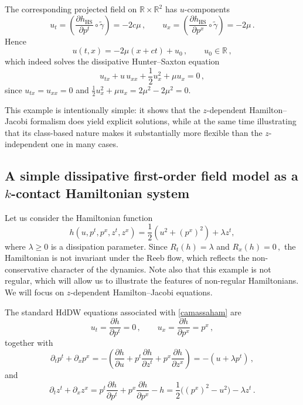 \documentclass[11pt,twoside]{article}
\theoremstyle{plain}
\theoremstyle{definition}
\theoremstyle{remark}
\begin{document}
The corresponding projected field on $\mathbb{R}\times\mathbb{R}^2$ has $u$-components
\[
u_t=\left(\frac{\partial h_{\mathrm{HS}}}{\partial p^t}\circ\widetilde{\gamma}\right)=-2c\mu\,,
\qquad
u_x=\left(\frac{\partial h_{\mathrm{HS}}}{\partial p^x}\circ\widetilde{\gamma}\right)=-2\mu\,.
\]
Hence
\[
u(t,x)=-2\mu(x+ct)+u_0\,,
\qquad u_0\in\mathbb{R}\,,
\]
which indeed solves the dissipative Hunter--Saxton equation
\[
u_{tx}+u\,u_{xx}+\frac12 u_x^2+\mu u_x=0\,,
\]
since $u_{tx}=u_{xx}=0$ and $\frac12 u_x^2+\mu u_x=2\mu^2-2\mu^2=0$.

This example is intentionally simple: it shows that the $z$-dependent Hamilton--Jacobi formalism does yield explicit solutions, while at the same time illustrating that its class-based nature makes it substantially more flexible than the $z$-independent one in many cases.



\subsection{A simple dissipative first-order field model as a \texorpdfstring{$k$}{}-contact Hamiltonian system}

Let us consider the Hamiltonian function
\begin{equation}\label{camassaham}
h(u,p^t,p^x,z^t,z^x)=\frac12\left(u^2+(p^x)^2\right)+\lambda z^t,
\end{equation}
where $\lambda\ge0$ is a dissipation parameter. Since \(R_t(h)=\lambda\) and \(R_x(h)=0\,,\) 
the Hamiltonian is not invariant under the Reeb flow, which reflects the non-conservative character of the dynamics. Note also that this example is not regular, which will allow us to illustrate the features of non-regular Hamiltonians. We will focus on $z$-dependent Hamilton--Jacobi equations.

The standard HdDW equations associated with \eqref{camassaham} are
\begin{equation}\label{eq:wave_standard_HdDW}
u_t=\frac{\partial h}{\partial p^t}=0\,,\qquad
u_x=\frac{\partial h}{\partial p^x}=p^x\,,
\end{equation}
together with
\begin{equation}\label{eq:wave_standard_momentum}
\partial_t p^t+\partial_x p^x
=
-\left(\frac{\partial h}{\partial u}
+p^t\frac{\partial h}{\partial z^t}
+p^x\frac{\partial h}{\partial z^x}\right)
=-(u+\lambda p^t)\,,
\end{equation}
and
\begin{equation}\label{eq:wave_standard_z}
\partial_t z^t+\partial_x z^x
=
p^t\frac{\partial h}{\partial p^t}+p^x\frac{\partial h}{\partial p^x}-h
=
\frac12\bigl((p^x)^2-u^2\bigr)-\lambda z^t\,.
\end{equation}
\end{document}
